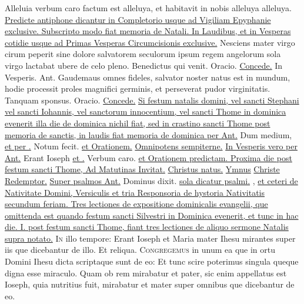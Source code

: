 \begin{multicols*}{2}
 Alleluia verbum caro factum est alleluya, et habitavit in nobis alleluya alleluya.
\newline \ul{Predicte antiphone dicantur in Completorio usque ad Vigiliam Epyphanie exclusive. Subscripto modo fiat memoria de Natali. In Laudibus, et in Vesperas cotidie usque ad Primas Vesperas Circumcisionis exclusive.}
 Nesciens mater virgo cirum peperit sine dolore salvatorem seculorum ipsum regem angelorum sola virgo lactabat ubere de celo pleno. \V Benedictus qui venit. {\color{Red} Oracio.} \hyperlink{concede-nativitas}{Concede.} {\color{Red} In Vesperis. Ant.} Gaudemaus omnes fideles, salvator noster natus est in mundum, hodie processit proles magnifici germinis, et perseverat pudor virginitatis. \V Tanquam sponsus. {\color{Red} Oracio.} \hyperlink{concede-nativitas}{Concede.}
\newline \ul{Si festum natalis domini, vel sancti Stephani vel sancti Iohannis, vel sanctorum innocentium, vel sancti Thome in dominica evenerit illa die de dominica nichil fiat, sed in crastino sancti Thome post memoria de sanctis, in laudis fiat memoria de dominica per Ant.} Dum medium, \ul{et per \Vbar .} Notum fecit. \ul{et Orationem.} \hyperlink{omnipotens-nativitas}{Omnipotens sempiterne.} \ul{In Vesperis vero per Ant.} Erant Ioseph \ul{et \Vbar .} Verbum caro. \ul{et Orationem predictam. Proxima die post festum sancti Thome, Ad Matutinas Invitat.} \hyperlink{christus-natus-invitatorium}{Christus natus.} \ul{Ymnus} \hyperlink{christe-redemptor}{Christe Redemptor.} \ul{Super psalmos Ant.} Dominus dixit. \ul{sola dicatur psalmi.} , \ul{et ceteri de Nativitate Domini, Versiculis et tria Responsoria de hystoria Nativitatis secundum feriam. Tres lectiones de expositione dominicalis evangelii, que omittenda est quando festum sancti Silvestri in Dominica evenerit, et tunc in hac die. I. post festum sancti Thome, fiant tres lectiones de aliquo sermone Natalis supra notato.}
\lettrine[lines=2]{\zallmancaps \color{Blue} I}{n} illo tempore: Erant Ioseph et Maria mater Ihesu mirantes super iis que dicebantur de illo. Et reliqua.
\lettrine[lines=2]{\zallmancaps \color{Red} C}{ongregemus} in unum ea que in ortu Domini Ihesu dicta scriptaque sunt de eo: Et tunc scire poterimus singula queque digna esse miraculo. Quam ob rem mirabatur et pater, sic enim appellatus est Ioseph, quia nutritius fuit, mirabatur et mater super omnibus que dicebantur de eo.

\end{multicols*}
